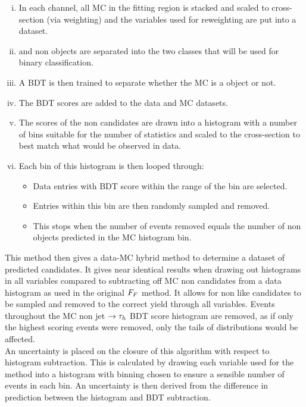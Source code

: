 \begin{enumerate}[i)]
  \item In each channel, all \ac{MC} in the fitting region is stacked and scaled to cross-section (via weighting) and the variables used for reweighting are put into a dataset.
  \item \jtth and non \jtth objects are separated into the two classes that will be used for binary classification.
  \item A \ac{BDT} is then trained to separate whether the \ac{MC} is a \jtth object or not.
  \item The \ac{BDT} scores are added to the data and \ac{MC} datasets.
  \item The scores of the non \jtth candidates are drawn into a histogram with a number of bins suitable for the number of statistics and scaled to the cross-section to best match what would be observed in data.
  \item Each bin of this histogram is then looped through:
  \begin{itemize}
    \item Data entries with \ac{BDT} score within the range of the bin are selected.
    \item Entries within this bin are then randomly sampled and removed.
    \item This stops when the number of events removed equals the number of non \jtth objects predicted in the \ac{MC} histogram bin.
  \end{itemize}
\end{enumerate} 

This method then gives a data-\ac{MC} hybrid method to determine a dataset of predicted \jtth candidates.
It gives near identical results when drawing out histograms in all variables compared to subtracting off \ac{MC} non \jtth candidates from a data histogram as used in the original $F_{F}$ method.
It allows for non \jtth like candidates to be sampled and removed to the correct yield through all variables.
Events throughout the \ac{MC} non jet $\rightarrow\tau_{h}$ \ac{BDT} score histogram are removed, as if only the highest scoring events were removed, only the tails of distributions would be affected. \\

An uncertainty is placed on the closure of this algorithm with respect to histogram subtraction.
This is calculated by drawing each variable used for the method into a histogram with binning chosen to ensure a sensible number of events in each bin.
An uncertainty is then derived from the difference in prediction between the histogram and \ac{BDT} subtraction. \\

